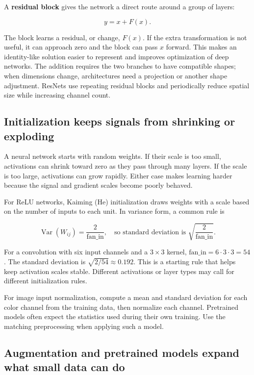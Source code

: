 A \textbf{residual block} gives the network a direct route around a group of layers:

\[y=x+F(x).\]

The block learns a residual, or change, \(F(x)\). If the extra transformation is not useful, it can approach zero and the block can pass \(x\) forward. This makes an identity-like solution easier to represent and improves optimization of deep networks. The addition requires the two branches to have compatible shapes; when dimensions change, architectures need a projection or another shape adjustment. ResNets use repeating residual blocks and periodically reduce spatial size while increasing channel count.

\subsection{Initialization keeps signals from shrinking or exploding}\label{04-visual-computing-ii-ch031-initialization-keeps-signals-from-shrinking-or-exploding}

A neural network starts with random weights. If their scale is too small, activations can shrink toward zero as they pass through many layers. If the scale is too large, activations can grow rapidly. Either case makes learning harder because the signal and gradient scales become poorly behaved.

For ReLU networks, Kaiming (He) initialization draws weights with a scale based on the number of inputs to each unit. In variance form, a common rule is

\[\operatorname{Var}(W_{ij})=\frac{2}{\text{fan\_in}}, \quad\text{so standard deviation is }\sqrt{\frac{2}{\text{fan\_in}}}.\]

For a convolution with six input channels and a \(3\times3\) kernel, \(\text{fan\_in}=6\cdot3\cdot3=54\). The standard deviation is \(\sqrt{2/54}\approx0.192\). This is a starting rule that helps keep activation scales stable. Different activations or layer types may call for different initialization rules.

For image input normalization, compute a mean and standard deviation for each color channel from the training data, then normalize each channel. Pretrained models often expect the statistics used during their own training. Use the matching preprocessing when applying such a model.

\subsection{Augmentation and pretrained models expand what small data can do}\label{04-visual-computing-ii-ch031-augmentation-and-pretrained-models-expand-what-small-data-can-do}

